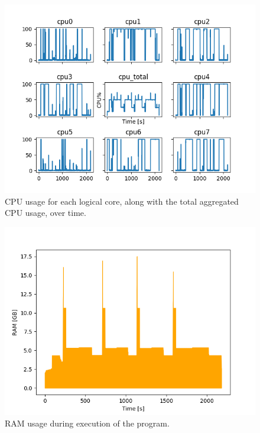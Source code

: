 \documentclass{kthreport}
\theoremstyle{definition}
\begin{document}
\begin{figure}[p]
    \includegraphics[width=\linewidth]{cpu.png}
    \caption{CPU usage for each logical core, along with the total aggregated CPU usage, over time.}
    \label{fig:cpu}
\end{figure}

\begin{figure}[p]
    \includegraphics[width=\linewidth]{ram.png}
    \caption{RAM usage during execution of the program.}
    \label{fig:ram}
\end{figure}
\end{document}

